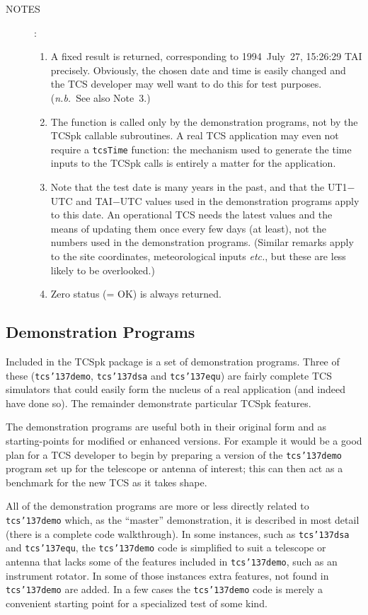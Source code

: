 \documentclass[12pt,fleqn,twoside]{article}
\renewcommand{\_}{{\tt\char'137}}     %
\newcommand{\notes}[1]
{
  \goodbreak
  \begin{description}
    \item[NOTES]: \nopagebreak
        #1
  \end{description}
  \vspace{-3ex}
}
\begin{document}
\notes{
\begin{enumerate}
\setlength{\parskip}{\medskipamount}
\item A fixed result is returned, corresponding to
      1994~July~27, 15:26:29 TAI precisely.  Obviously, the chosen
      date and time is easily changed and the TCS developer may
      well want to do this for test purposes.  ({\it n.b.}~See
      also Note~3.)
\item The function is called only by the demonstration programs,
      not by the TCSpk callable subroutines.  A real TCS application
      may even not require a {\tt tcsTime} function: the mechanism used
      to generate the time inputs to the TCSpk calls is entirely
      a matter for the application.
\item Note that the test date is many years in the past, and that
      the UT1$-$UTC and TAI$-$UTC values used in the demonstration
      programs apply to this date.  An operational
      TCS needs the latest values and the means of updating
      them once every few days (at least), not the numbers used in
      the demonstration programs.  (Similar remarks apply to
      the site coordinates, meteorological inputs {\it etc.}, but
      these are less likely to be overlooked.)
\item Zero status (= OK) is always returned.
\end{enumerate}
}

\newpage
\subsection{Demonstration Programs}
\label{demos}

Included in the TCSpk package is a set of demonstration programs.  Three
of these ({\tt tcs\_demo}, {\tt tcs\_dsa} and {\tt tcs\_equ}) are
fairly complete TCS simulators that could easily form the nucleus of
a real application (and indeed have done so).  The remainder demonstrate
particular TCSpk features.

The demonstration programs are useful both in their original form and as
starting-points for modified or enhanced versions.  For example it would
be a good plan for a TCS developer to begin by preparing a version of the
{\tt tcs\_demo} program set up for the telescope or antenna of interest;
this can then act as a benchmark for the new TCS as it takes shape.

All of the demonstration programs are more or less directly related to
{\tt tcs\_demo} which, as the ``master'' demonstration,
it is described in most detail (there is a complete code
walkthrough).
In some instances, such as
{\tt tcs\_dsa} and {\tt tcs\_equ},
the {\tt tcs\_demo} code is simplified to suit a
telescope or antenna that lacks some of the features included in
{\tt tcs\_demo}, such as an instrument rotator.  In some of
those instances extra
features, not found in {\tt tcs\_demo} are added.  In a
few cases the {\tt tcs\_demo} code is merely
a convenient starting point for a specialized test of some kind.
\end{document}

